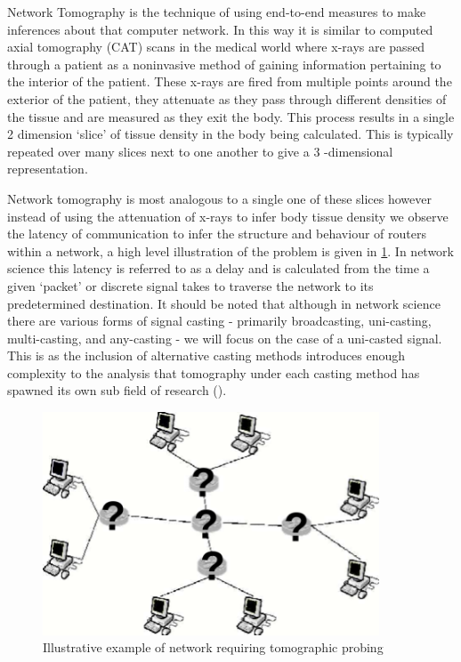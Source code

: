 Network Tomography is the technique of using end-to-end measures to make inferences about that computer network. In this way it is similar to computed axial tomography (CAT) scans in the medical world where x-rays are passed through a patient as a noninvasive method of gaining information pertaining to the interior of the patient. These x-rays are fired from multiple points around the exterior of the patient, they attenuate as they pass through different densities of the tissue and are measured as they exit the body. This process results in a single 2 dimension ‘slice’ of tissue density in the body being calculated. This is typically repeated over many slices next to one another to give a 3 -dimensional representation.\par
Network tomography is most analogous to a single one of these slices however instead of using the attenuation of x-rays to infer body tissue density we observe the latency of communication to infer the structure and behaviour of routers within a network, a high level illustration of the problem is given in \ref{fig:nettom?}. In network science this latency is referred to as a delay and is calculated from the time a given ‘packet’ or discrete signal takes to traverse the network to its predetermined destination. It should be noted that although in network science there are various forms of signal casting - primarily broadcasting, uni-casting, multi-casting, and any-casting - we will focus on the case of a uni-casted signal. This is as the inclusion of alternative casting methods introduces enough complexity to the analysis that tomography under each casting method has spawned its own sub field of research (\cite{lawrence_network_2006}).\par
\begin{figure}
    \centering
    \includegraphics[width=10cm]{figs/nettom-illustration.png}
    \caption[Illustrative example of network requiring tomographic probing]{Illustrative example of network requiring tomographic probing \cite{lawrence_network_2006}}
    \label{fig:nettom?}
\end{figure}

